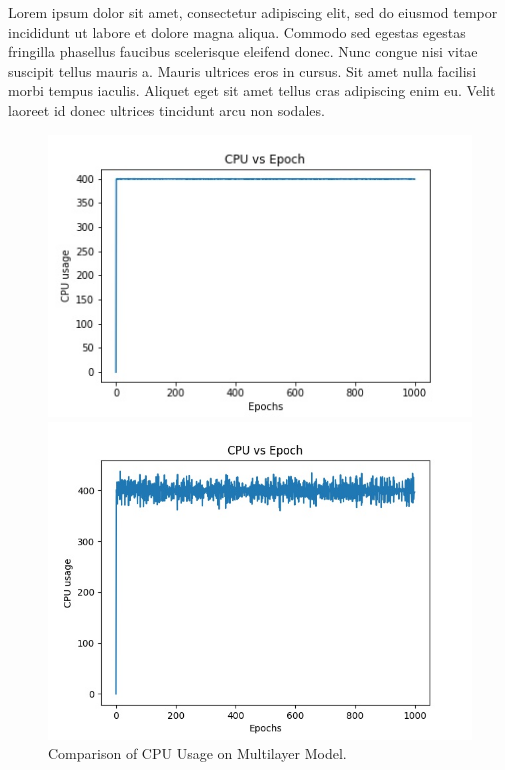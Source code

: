 \documentclass{cup-ino}
\begin{document}
Lorem ipsum dolor sit amet, consectetur adipiscing elit, sed do eiusmod tempor incididunt ut labore et dolore magna aliqua. Commodo sed egestas egestas fringilla phasellus faucibus scelerisque eleifend donec. Nunc congue nisi vitae suscipit tellus mauris a. Mauris ultrices eros in cursus. Sit amet nulla facilisi morbi tempus iaculis. Aliquet eget sit amet tellus cras adipiscing enim eu. Velit laoreet id donec ultrices tincidunt arcu non sodales.

\begin{figure}[h!]
\begin{minipage}{0.47\textwidth}
\includegraphics[width=\linewidth]{images/multi_gen_cpu.jpeg}
\end{minipage}
\hfill
\begin{minipage}{0.47\textwidth}
\includegraphics[width=\linewidth]{images/multi_grad_cpu.jpeg}
\end{minipage}

\caption{Comparison of CPU Usage on Multilayer Model.}
\label{fig:multiCPU}
\end{figure}
\end{document}
